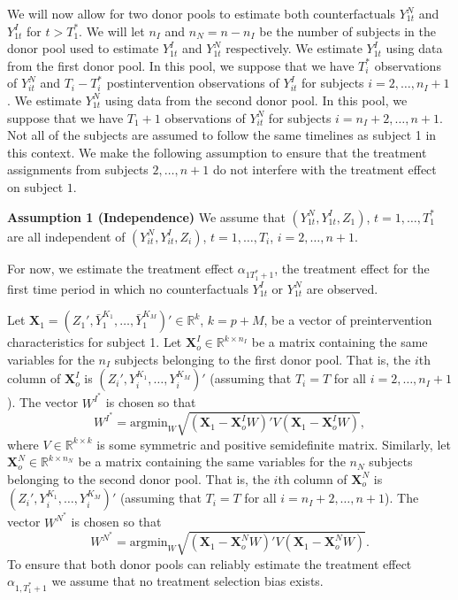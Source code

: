\documentclass[11pt]{article}
\newcommand{\R}{\mathbb{R}}
\newcommand{\X}{\textbf{X}}
\newcommand{\Tstar}{T^{\textstyle{*}}}
\newcommand{\WstarI}{W^{I^{\textstyle{*}}}}
\newcommand{\WstarN}{W^{N^{\textstyle{*}}}}
\begin{document}
We will now allow for two donor pools to estimate both counterfactuals $Y_{1t}^N$ and $Y_{1t}^I$ for $t > \Tstar_1$. We will let $n_I$ and $n_N = n - n_I$ be the number of subjects in the donor pool used to estimate $Y_{1t}^I$ and $Y_{1t}^N$ respectively. We estimate $Y_{1t}^I$ using data from the first donor pool. In this pool, we suppose that we have $\Tstar_i$ observations of $Y_{it}^N$ and $T_i - \Tstar_i$ postintervention observations of $Y_{it}^I$ for subjects $i = 2,\ldots,n_I+1$. We estimate $Y_{1t}^N$ using data from the second donor pool. In this pool, we suppose that we have $T_1 + 1$ observations of $Y_{it}^N$ %
for subjects $i = n_I+2,\ldots,n+1$. %
Not all of the subjects are assumed to follow the same timelines as subject 1 in this context. We make the following assumption to ensure that the treatment assignments from subjects $2,\ldots,n+1$ do not interfere with the treatment effect on subject $1$.


\vspace*{0.5cm}
\noindent\textbf{Assumption 1 (Independence)} We assume that $(Y_{1t}^N,Y_{1t}^I,Z_1)$, $t = 1,\ldots,\Tstar_1$ are all independent of $(Y_{it}^N, Y_{it}^I, Z_i)$, $t = 1,\ldots,T_i$, $i = 2,\ldots,n+1$. 
\vspace*{0.5cm}

For now, we estimate the treatment effect $\alpha_{1\Tstar_1+1}$, the treatment effect for the first time period in which no counterfactuals $Y_{1t}^I$ or $Y_{1t}^N$ are observed. 


Let $\X_1 = (Z_1', \bar{Y}_1^{K_1}, \ldots, \bar{Y}_1^{K_M} )' \in \R^{k}$, $k = p + M$, be a vector of preintervention characteristics for subject 1. Let $\X_o^I \in \R^{k \times n_I}$ be a matrix containing the same variables for the $n_I$ subjects belonging to the first donor pool. That is, the $i$th column of $\X_o^I$ is $(Z_i',Y_i^{K_1},\ldots,Y_i^{K_M})'$ (assuming that $T_i = T$ for all $i = 2,\ldots,n_I+1$). The vector $\WstarI$ is chosen so that  
$$
  \WstarI = \text{argmin}_{W} \sqrt{(\X_1 - \X_o^IW)'V(\X_1 - \X_o^IW)},
$$
where $V \in \R^{k \times k}$ is some symmetric and positive semidefinite matrix. Similarly, let $\X_o^N \in \R^{k \times n_N}$ be a matrix containing the same variables for the $n_N$ subjects belonging to the second donor pool. That is, the $i$th column of $\X_o^N$ is $(Z_i',Y_i^{K_1},\ldots,Y_i^{K_M})'$ (assuming that $T_i = T$ for all $i = n_I+2,\ldots,n+1$). The vector $\WstarN$ is chosen so that  
$$
  \WstarN = \text{argmin}_{W} \sqrt{(\X_1 - \X_o^NW)'V(\X_1 - \X_o^NW)}.
$$
To ensure that both donor pools can reliably estimate the treatment effect $\alpha_{1,\Tstar_1+1}$ we assume that no treatment selection bias exists.
\end{document}
